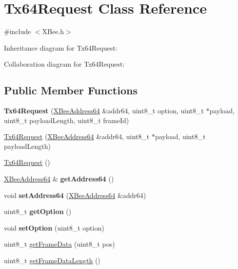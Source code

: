 \hypertarget{class_tx64_request}{}\section{Tx64\+Request Class Reference}
\label{class_tx64_request}


{\ttfamily \#include $<$X\+Bee.\+h$>$}



Inheritance diagram for Tx64\+Request\+:


Collaboration diagram for Tx64\+Request\+:
\subsection*{Public Member Functions}
\begin{DoxyCompactItemize}
\item 
\hypertarget{class_tx64_request_a7670fd44d8765d8215a3e5cfcf605c1e}{}\label{class_tx64_request_a7670fd44d8765d8215a3e5cfcf605c1e} 
{\bfseries Tx64\+Request} (\hyperlink{class_x_bee_address64}{X\+Bee\+Address64} \&addr64, uint8\+\_\+t option, uint8\+\_\+t $\ast$payload, uint8\+\_\+t payload\+Length, uint8\+\_\+t frame\+Id)
\item 
\hyperlink{class_tx64_request_a7c9d830fa804daaf39ed368894cf9691}{Tx64\+Request} (\hyperlink{class_x_bee_address64}{X\+Bee\+Address64} \&addr64, uint8\+\_\+t $\ast$payload, uint8\+\_\+t payload\+Length)
\item 
\hyperlink{class_tx64_request_a49bd84b4aa5478c27e6da5581b2e1d3c}{Tx64\+Request} ()
\item 
\hypertarget{class_tx64_request_a8f6970aa54b8504be65e05ce1f52e8e4}{}\label{class_tx64_request_a8f6970aa54b8504be65e05ce1f52e8e4} 
\hyperlink{class_x_bee_address64}{X\+Bee\+Address64} \& {\bfseries get\+Address64} ()
\item 
\hypertarget{class_tx64_request_a863a993ad01c08b5c9835e9d7288bedd}{}\label{class_tx64_request_a863a993ad01c08b5c9835e9d7288bedd} 
void {\bfseries set\+Address64} (\hyperlink{class_x_bee_address64}{X\+Bee\+Address64} \&addr64)
\item 
\hypertarget{class_tx64_request_aac90589d46191868f19713aea49a421f}{}\label{class_tx64_request_aac90589d46191868f19713aea49a421f} 
uint8\+\_\+t {\bfseries get\+Option} ()
\item 
\hypertarget{class_tx64_request_a7f6987e3910d97dd8f77f58184dc17c9}{}\label{class_tx64_request_a7f6987e3910d97dd8f77f58184dc17c9} 
void {\bfseries set\+Option} (uint8\+\_\+t option)
\item 
uint8\+\_\+t \hyperlink{class_tx64_request_afe3662433da85acd21f8a3d90844a084}{get\+Frame\+Data} (uint8\+\_\+t pos)
\item 
uint8\+\_\+t \hyperlink{class_tx64_request_afadc1e07718a62d6c5a75a4bb07dfaae}{get\+Frame\+Data\+Length} ()
\end{DoxyCompactItemize}
